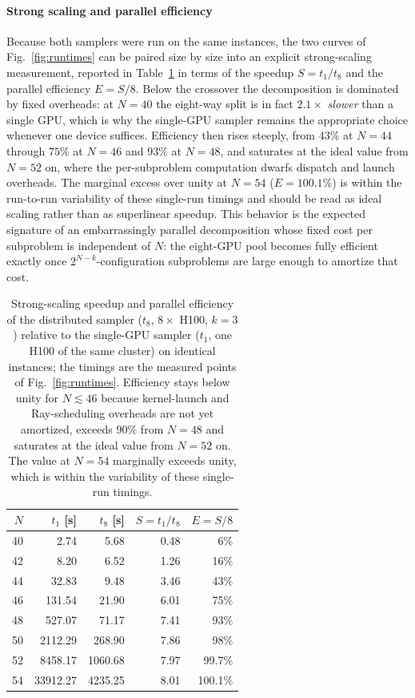 \documentclass[preprint,12pt,a4paper]{elsarticle}
\begin{document}
\paragraph{Strong scaling and parallel efficiency}
Because both samplers were run on the same instances, the two curves of
Fig.~\ref{fig:runtimes} can be paired size by size into an explicit
strong-scaling measurement, reported in Table~\ref{tab:efficiency} in terms of
the speedup $S=t_1/t_8$ and the parallel efficiency $E=S/8$. Below the crossover
the decomposition is dominated by fixed overheads: at $N=40$ the eight-way split
is in fact $2.1\times$ \emph{slower} than a single GPU, which is why the
single-GPU sampler remains the appropriate choice whenever one device suffices.
Efficiency then rises steeply, from $43\%$ at $N=44$ through $75\%$ at $N=46$ and
$93\%$ at $N=48$, and saturates at the ideal value from $N=52$ on, where the
per-subproblem computation dwarfs dispatch and launch overheads. The marginal
excess over unity at $N=54$ ($E=100.1\%$) is within the run-to-run variability of
these single-run timings and should be read as ideal scaling rather than as
superlinear speedup. This behavior is the expected signature of an
embarrassingly parallel decomposition whose fixed cost per subproblem is
independent of $N$: the eight-GPU pool becomes fully efficient exactly once
$2^{N-k}$-configuration subproblems are large enough to amortize that cost.

\begin{table}[H]
\centering
\begin{tabular}{|r|r|r|r|r|}
\hline
$N$ & $t_1$ [s] & $t_8$ [s] & $S=t_1/t_8$ & $E=S/8$ \\
\hline
40 & 2.74      & 5.68     & 0.48 & 6\% \\
42 & 8.20      & 6.52     & 1.26 & 16\% \\
44 & 32.83     & 9.48     & 3.46 & 43\% \\
46 & 131.54    & 21.90    & 6.01 & 75\% \\
48 & 527.07    & 71.17    & 7.41 & 93\% \\
50 & 2112.29   & 268.90   & 7.86 & 98\% \\
52 & 8458.17   & 1060.68  & 7.97 & 99.7\% \\
54 & 33912.27  & 4235.25  & 8.01 & 100.1\% \\
\hline
\end{tabular}
\caption{Strong-scaling speedup and parallel efficiency of the distributed
sampler ($t_8$, $8\times$ H100, $k=3$) relative to the single-GPU sampler
($t_1$, one H100 of the same cluster) on identical instances; the timings are the
measured points of Fig.~\ref{fig:runtimes}. Efficiency stays below unity for
$N \lesssim 46$ because kernel-launch and Ray-scheduling overheads are not yet
amortized, exceeds $90\%$ from $N=48$ and saturates at the ideal value from
$N=52$ on. The value at $N=54$ marginally exceeds unity, which is within the
variability of these single-run timings.}
\label{tab:efficiency}
\end{table}
\end{document}
